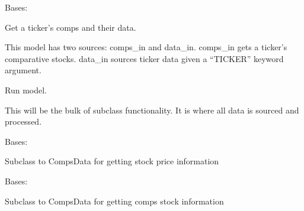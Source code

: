 \documentclass[letterpaper,10pt,english]{sphinxmanual}
\begin{document}
\begin{fulllineitems}
\label{\detokenize{dalio.model:dalio.model.CompsData}}
Bases: {\hyperref[\detokenize{dalio.model:dalio.model.model.Model}]{}}

Get a ticker’s comps and their data.

This model has two sources: comps\_in and data\_in. comps\_in gets a
ticker’s comparative stocks. data\_in sources ticker data given a “TICKER”
keyword argument.

\begin{fulllineitems}
\label{\detokenize{dalio.model:dalio.model.CompsData.run}}
Run model.

This will be the bulk of subclass functionality. It is where all
data is sourced and processed.

\end{fulllineitems}


\end{fulllineitems}


\begin{fulllineitems}
\label{\detokenize{dalio.model:dalio.model.CompsFinancials}}
Bases: {\hyperref[\detokenize{dalio.model:dalio.model.financial.CompsData}]{}}

Subclass to CompsData for getting stock price information

\end{fulllineitems}


\begin{fulllineitems}
\label{\detokenize{dalio.model:dalio.model.CompsInfo}}
Bases: {\hyperref[\detokenize{dalio.model:dalio.model.financial.CompsData}]{}}

Subclass to CompsData for getting comps stock information

\end{fulllineitems}
\end{document}
